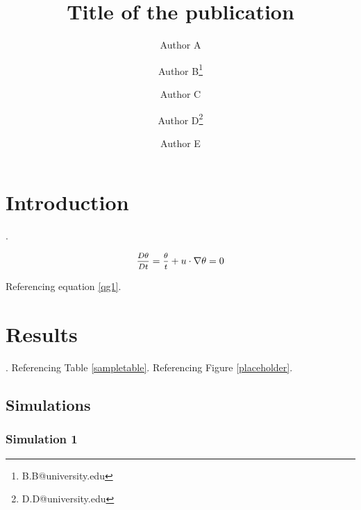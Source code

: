 \documentclass[a4paper, oneside, twocolumn, 11pt, green]{ssjtwo}
\begin{document}
\title{Title of the publication} 
\author[1]{Author A}
\author[1]{Author B\thanks{B.B@university.edu}}
\author[1]{Author C}
\author[2]{Author D\thanks{D.D@university.edu}}
\author[2]{Author E}





\maketitle 

\begin{article}

\begin{abstract}
\noindent
\lipsum[1]
\end{abstract}

\section*{Introduction}

\lipsum[3] \cite{CLAcha1}.

\begin{equation}
\mfrac{D \theta}{Dt}=\mfrac{ \theta}{ t} + u\cdot \nabla
\theta=0 \label{qg1}
\end{equation}

Referencing equation \eqref{qg1}. \lipsum[1]

\section*{Results}

\lipsum[1]. Referencing Table \ref{sampletable}. Referencing Figure \ref{placeholder}.

\subsection*{Simulations}

\subsubsection{Simulation 1}

\lipsum[1]\cite{pepnovo}\cite{twowayparallele}


\end{article}
\end{document}
